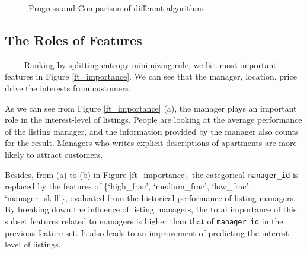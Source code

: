 \documentclass{article}
\begin{document}
\begin{figure}[h]
\centering
{}
\caption{Progress and Comparison of different algorithms}
\label{comp_result}
\end{figure}

\subsection{The Roles of Features}

~~~~ Ranking by splitting entropy minimizing rule, we list most important features in Figure \ref{ft_importance}. We can see that the manager, location, price drive the interests from customers. 

As we can see from Figure \ref{ft_importance} (a), the manager plays an important role in the interest-level of listings. People are looking at the average performance of the listing manager, and the information provided by the manager also counts for the result. Managers who writes explicit descriptions of apartments are more likely to attract customers. 

Besides, from (a) to (b) in Figure \ref{ft_importance}, the categorical \texttt{manager\_id} is replaced by the features of \{`high\_frac', `medium\_frac', `low\_frac', `manager\_skill'\}, evaluated from the historical performance of listing managers. By breaking down the influence of listing managers, the total importance of this subset features related to managers is higher than that of \texttt{manager\_id} in the previous feature set. It also leads to an improvement of predicting the interest-level of listings. 
\end{document}
